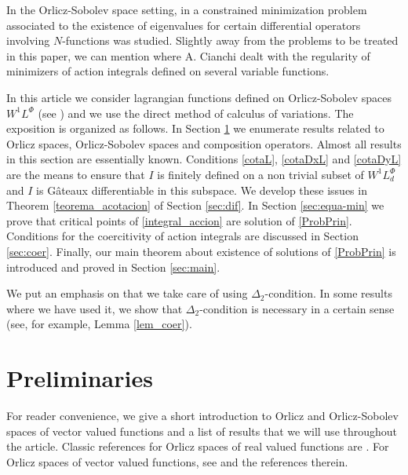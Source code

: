 \documentclass[twoside]{article}
\theoremstyle{remark}
\newcommand{\lphi}{L^{\Phi}}
\begin{document}
  In the Orlicz-Sobolev space setting, 
	in \cite{m-1999} a constrained minimization problem associated to the existence of eigenvalues for certain differential operators involving $N$-functions was studied.  
Slightly away from the problems to be treated in this paper, 
we can mention \cite{cianchi2000local, cianchi1999gradient} where A. Cianchi dealt with 
the regularity of minimizers of action integrals defined on several variable functions.

In this article  we consider lagrangian functions  defined on Orlicz-Sobolev spaces $W^{1}L^{\Phi}$    
(see \cite{adams_sobolev,KR, rao1991theory,2002applications}) 
and we use  the direct method of calculus of variations. 
The exposition is organized as follows. 
In Section \ref{preliminares} we enumerate results related to Orlicz spaces, Orlicz-Sobolev spaces and composition operators. 
Almost all results in this section  are essentially known. Conditions \eqref{cotaL}, \eqref{cotaDxL} and \eqref{cotaDyL} are the means to ensure that $I$ is finitely defined on 
a non trivial subset of $W^{1}\lphi_d$ and $I$ is G\^ateaux differentiable in this subspace. 
We develop 
these issues in Theorem \ref{teorema_acotacion}  of Section \ref{sec:dif}. In Section \ref{sec:equa-min} we prove that critical points of \eqref{integral_accion}
 are solution of \eqref{ProbPrin}. Conditions for the coercitivity of action integrals are discussed in Section \ref{sec:coer}. Finally, our main theorem about existence of solutions of  \eqref{ProbPrin} is introduced and proved in Section \ref{sec:main}. 

We put an emphasis on that we take care of using $\Delta_2$-condition. 
In some results where we have used it,
we show that $\Delta_2$-condition is necessary in a certain sense (see, for example, Lemma \ref{lem_coer}).
   




\section{Preliminaries}\label{preliminares}

For reader convenience, we give a short introduction to Orlicz and Orlicz-Sobolev spaces of vector valued functions and a  list  of results that we will use throughout the article. 
Classic references for Orlicz spaces of real valued functions are \cite{adams_sobolev,KR,rao1991theory}.
For  Orlicz spaces of vector valued functions, see \cite{Orliczvectorial2005} and the references therein.
\end{document}
